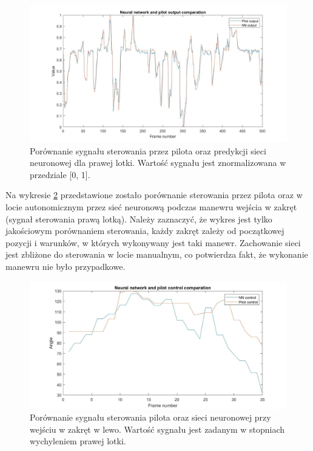 \documentclass[12pt, a4paper]{article}
\begin{document}
 \begin{figure}[H]
    \centering
    \includegraphics[width=1\textwidth]{nnvskac}
    \caption{Porównanie sygnału sterowania przez pilota oraz predykcji sieci neuronowej dla prawej lotki. Wartość sygnału jest znormalizowana w przedziale [0, 1].}
    \label{fig:aivskac}
\end{figure}

Na wykresie \ref{fig:nnturn} przedstawione zostało porównanie sterowania przez pilota oraz w locie autonomicznym przez sieć neuronową podczas manewru wejścia w zakręt (sygnał sterowania prawą lotką). Należy zaznaczyć, że wykres jest tylko jakościowym porównaniem sterowania, każdy zakręt zależy od początkowej pozycji i warunków, w których wykonywany jest taki manewr. Zachowanie sieci jest zbliżone do sterowania w locie manualnym, co potwierdza fakt, że wykonanie manewru nie było przypadkowe. 


 \begin{figure}[H]
    \centering
    \includegraphics[width=1\textwidth]{nnturn}
    \caption{Porównanie sygnału sterowania pilota oraz sieci neuronowej przy wejściu w zakręt w lewo. Wartość sygnału jest zadanym w stopniach wychyleniem prawej lotki.}
    \label{fig:nnturn}
\end{figure}
\end{document}
